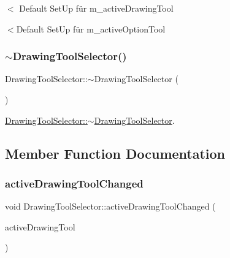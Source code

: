$<$ Default Set\+Up für m\+\_\+active\+Drawing\+Tool

$<$Default Set\+Up für m\+\_\+active\+Option\+Tool \mbox{\label{class_drawing_tool_selector_ad5f2e810c40bbeb995711860f6a22394}} 
\subsubsection{\texorpdfstring{$\sim$\+Drawing\+Tool\+Selector()}{~DrawingToolSelector()}}
{\footnotesize\ttfamily Drawing\+Tool\+Selector\+::$\sim$\+Drawing\+Tool\+Selector (\begin{DoxyParamCaption}{ }\end{DoxyParamCaption})}



\hyperlink{class_drawing_tool_selector_ad5f2e810c40bbeb995711860f6a22394}{Drawing\+Tool\+Selector\+::$\sim$\+Drawing\+Tool\+Selector}. 



\subsection{Member Function Documentation}
\mbox{\label{class_drawing_tool_selector_afd6c053c93d273fc110e8f11c0631ff3}} 
\subsubsection{\texorpdfstring{active\+Drawing\+Tool\+Changed}{activeDrawingToolChanged}}
{\footnotesize\ttfamily void Drawing\+Tool\+Selector\+::active\+Drawing\+Tool\+Changed (\begin{DoxyParamCaption}\item[{\hyperlink{class_tools_ab031688a77e89a80ce8b5db7014684a3}{Tools\+::\+Draw\+Tool}}]{active\+Drawing\+Tool }\end{DoxyParamCaption})\hspace{0.3cm}{\ttfamily [signal]}}




